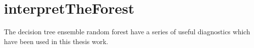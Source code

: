 \chapter{interpretTheForest}

The decision tree ensemble random forest have a series of useful diagnostics which have been used in this thesis work.

